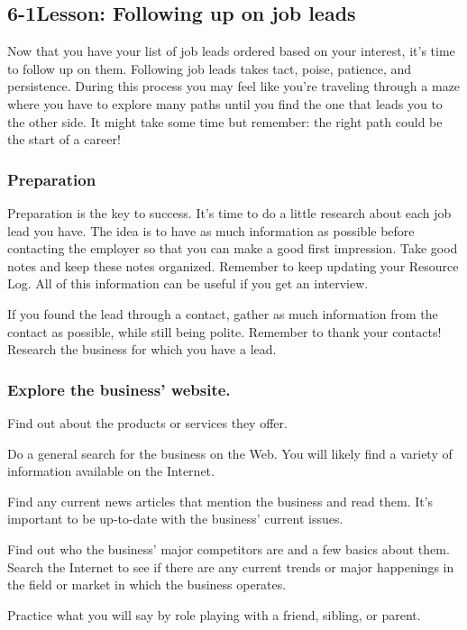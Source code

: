 \pagebreak \subsection*{6-1\quad Lesson: Following up on job leads}
Now that you have your list of job leads ordered based on your interest, it's time to follow up on them. Following job leads takes tact, poise, patience, and persistence. During this process you may feel like you're traveling through a maze where you have to explore many paths until you find the one that leads you to the other side. It might take some time but remember: the right path could be the start of a career!

\subsubsection*{Preparation}

Preparation is the key to success. It's time to do a little research about each job lead you have. The idea is to have as much information as possible before contacting the employer so that you can make a good first impression. Take good notes and keep these notes organized. Remember to keep updating your Resource Log. All of this information can be useful if you get an interview.

If you found the lead through a contact, gather as much information from the contact as possible, while still being polite. Remember to thank your contacts!
Research the business for which you have a lead.

\subsubsection*{Explore the business’ website.}
Find out about the products or services they offer.

Do a general search for the business on the Web. You will likely find a variety of information available on the Internet.

Find any current news articles that mention the business and read them. It's important to be up-to-date with the business' current issues.

Find out who the business’ major competitors are and a few basics about them.
Search the Internet to see if there are any current trends or major happenings in the field or market in which the business operates.

Practice what you will say by role playing with a friend, sibling, or parent.

